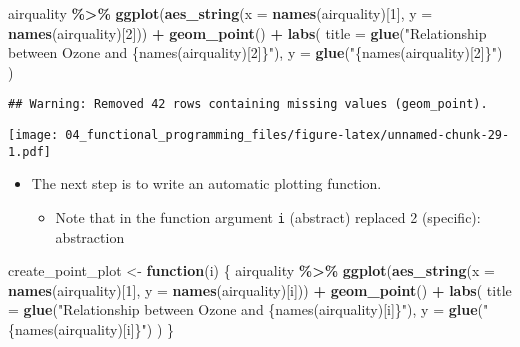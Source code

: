 \documentclass[
]{book}
\newenvironment{Shaded}{\begin{snugshade}}{\end{snugshade}}
\newcommand{\ControlFlowTok}[1]{\textcolor[rgb]{0.13,0.29,0.53}{\textbf{#1}}}
\newcommand{\DataTypeTok}[1]{\textcolor[rgb]{0.13,0.29,0.53}{#1}}
\newcommand{\DecValTok}[1]{\textcolor[rgb]{0.00,0.00,0.81}{#1}}
\newcommand{\KeywordTok}[1]{\textcolor[rgb]{0.13,0.29,0.53}{\textbf{#1}}}
\newcommand{\NormalTok}[1]{#1}
\newcommand{\OperatorTok}[1]{\textcolor[rgb]{0.81,0.36,0.00}{\textbf{#1}}}
\newcommand{\StringTok}[1]{\textcolor[rgb]{0.31,0.60,0.02}{#1}}
\providecommand{\tightlist}{%
  \setlength{\itemsep}{0pt}\setlength{\parskip}{0pt}}
\begin{document}
\begin{Shaded}
\begin{Highlighting}[]
\NormalTok{airquality }\OperatorTok{\%\textgreater{}\%}
\StringTok{  }\KeywordTok{ggplot}\NormalTok{(}\KeywordTok{aes\_string}\NormalTok{(}\DataTypeTok{x =} \KeywordTok{names}\NormalTok{(airquality)[}\DecValTok{1}\NormalTok{], }\DataTypeTok{y =} \KeywordTok{names}\NormalTok{(airquality)[}\DecValTok{2}\NormalTok{])) }\OperatorTok{+}
\StringTok{  }\KeywordTok{geom\_point}\NormalTok{() }\OperatorTok{+}
\StringTok{  }\KeywordTok{labs}\NormalTok{(}
    \DataTypeTok{title =} \KeywordTok{glue}\NormalTok{(}\StringTok{"Relationship between Ozone and \{names(airquality)[2]\}"}\NormalTok{),}
    \DataTypeTok{y =} \KeywordTok{glue}\NormalTok{(}\StringTok{"\{names(airquality)[2]\}"}\NormalTok{)}
\NormalTok{  )}
\end{Highlighting}
\end{Shaded}

\begin{verbatim}
## Warning: Removed 42 rows containing missing values (geom_point).
\end{verbatim}

\texttt{[image: 04\_functional\_programming\_files/figure-latex/unnamed-chunk-29-1.pdf]}

\begin{itemize}
\item
  The next step is to write an automatic plotting function.

  \begin{itemize}
  \tightlist
  \item
    Note that in the function argument \texttt{i} (abstract) replaced 2 (specific): abstraction
  \end{itemize}
\end{itemize}

\begin{Shaded}
\begin{Highlighting}[]
\NormalTok{create\_point\_plot \textless{}{-}}\StringTok{ }\ControlFlowTok{function}\NormalTok{(i) \{}
\NormalTok{  airquality }\OperatorTok{\%\textgreater{}\%}
\StringTok{    }\KeywordTok{ggplot}\NormalTok{(}\KeywordTok{aes\_string}\NormalTok{(}\DataTypeTok{x =} \KeywordTok{names}\NormalTok{(airquality)[}\DecValTok{1}\NormalTok{], }\DataTypeTok{y =} \KeywordTok{names}\NormalTok{(airquality)[i])) }\OperatorTok{+}
\StringTok{    }\KeywordTok{geom\_point}\NormalTok{() }\OperatorTok{+}
\StringTok{    }\KeywordTok{labs}\NormalTok{(}
      \DataTypeTok{title =} \KeywordTok{glue}\NormalTok{(}\StringTok{"Relationship between Ozone and \{names(airquality)[i]\}"}\NormalTok{),}
      \DataTypeTok{y =} \KeywordTok{glue}\NormalTok{(}\StringTok{"\{names(airquality)[i]\}"}\NormalTok{)}
\NormalTok{    )}
\NormalTok{\}}
\end{Highlighting}
\end{Shaded}
\end{document}
